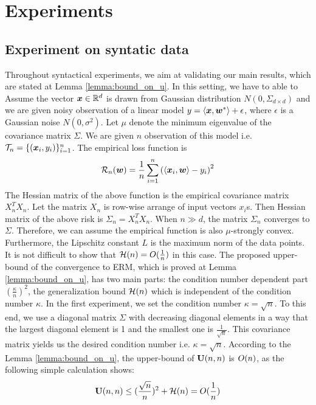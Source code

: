 \section{Experiments}
\subsection{Experiment on syntatic data}
Throughout syntactical experiments, we aim at validating our main results,
which are stated at Lemma \ref{lemma:bound_on_u}. In this setting, we have to able to 
Assume the vector $\bm{x} \in \mathbb{R}^d$ is drawn from Gaussian distribution $N(0,\Sigma_{d \times d})$ and we are given noisy observation of a linear model $y = \langle \bm{x}, \bm{w}^* \rangle + \epsilon$, where $\epsilon$ is a
Gaussian noise $N(0,\sigma^2)$. Let $\mu$ denote the minimum eigenvalue of the
covariance matrix $\Sigma$.
We are given $n$ observation of this model i.e.
 ${\cal T}_n = \{ 
(\bm{x}_i,y_i)\}_{i=1}^n$. The empirical loss function is 
\begin{equation*}
	{\cal R}_n(\bm{w}) = \frac{1}{n} \sum_{i=1}^n \left(\langle \bm{x}_i, \bm{w}\rangle -
	y_i\right)^2
\end{equation*}
The Hessian matrix of the above function is the empirical covariance matrix
$X_n^T X_n$.
Let the matrix $X_n$ is row-wise arrange of input vectors $x_i$s. Then
Hessian matrix of the above risk is $\Sigma_n = X_n^T X_n$. When $n \gg d$, the
matrix $\Sigma_n$ converges to $\Sigma$. Therefore, we can assume the
empirical function is also $\mu$-strongly convex. Furthermore, the Lipschitz
constant $L$ is the maximum norm of the data points. It is not difficult to
show that ${\cal H}(n) = O(\frac{1}{n})$ in this case.
The proposed upper-bound of the convergence to ERM, which is proved at Lemma
\ref{lemma:bound_on_u}, has two main parts: the condition number dependent part $(\frac{\kappa}{n})^2$, the
generalization bound ${\cal H}(n)$ which is independent of the condition number
$\kappa$. In the first experiment, we set the condition number $\kappa =
\sqrt{n}$. To this end, we use a diagonal matrix
$\Sigma$ with decreasing diagonal elements in a way that the largest diagonal
element is 1 and the smallest one is $\frac{1}{\sqrt{n}}$. This covariance
matrix yields us the desired condition number i.e. $\kappa = \sqrt{n}$.
According to the Lemma \ref{lemma:bound_on_u}, the upper-bound of $\mathbf U(n,n)$ is
$O(n)$, as the following simple calculation shows: 
\begin{equation*}
	\mathbf U(n,n) \leq (\frac{\sqrt{n}}{n})^2 + {\cal H}(n) = O(\frac{1}{n})
\end{equation*}
